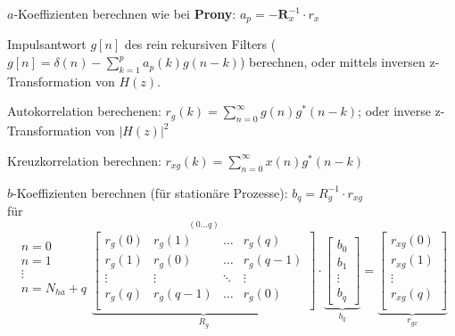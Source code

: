 \begin{aufzaehlung}
  		\item $a$-Koeffizienten berechnen wie bei \textbf{Prony}: $a_p = - \bm R_x^{-1} \cdot r_x$   
  		\item Impulsantwort $g[n]$ des rein rekursiven Filters ($g[n] = \delta(n)- \sum\limits_{k=1}^p a_p(k)g(n-k)$) berechnen, 
  		oder mittels inversen z-Transformation von $H(z)$.
  		\item Autokorrelation berechenen:  $r_g(k)=\sum\limits_{n=0}^\infty g(n)g^*(n-k)$; oder inverse z-Transformation von $|H(z)|^2$
  		\item Kreuzkorrelation berechnen: $r_{xg}(k)=\sum\limits_{n=0}^\infty x(n)g^*(n-k)$
  		\item $b$-Koeffizienten berechnen (für stationäre Prozesse): $b_q = R_g^{-1} \cdot r_{xg}$ \\
  		für\\
  		
			
		 $$\begin{matrix}n=0\\ n=1\\ \vdots\\ n=N_{ha}+q\\ \end{matrix}
		\overset{(0 \hdots q)}{\underbrace{\begin{bmatrix}
    		r_g(0) & r_g(1) & \hdots & r_g(q) \\                                            
    		r_g(1) & r_g(0) & \hdots & r_g(q-1) \\         
    		\vdots & \vdots & \ddots & \vdots \\                                      
    		r_g(q) &r_g(q-1) & \hdots & r_g(0) \\    
		\end{bmatrix}  }_{R_g}} \cdot \underbrace{\begin{bmatrix}
    		b_0 \\
    		b_1 \\
    		\vdots \\
    		b_q
		\end{bmatrix}  }_{b_q}= \underbrace{\begin{bmatrix}
    		r_{xg}(0) \\
    		r_{xg}(1) \\
    		\vdots \\
    		r_{xg}(q) \\
		\end{bmatrix}  }_{r_{gx}} $$   \normalsize
\end{aufzaehlung}


